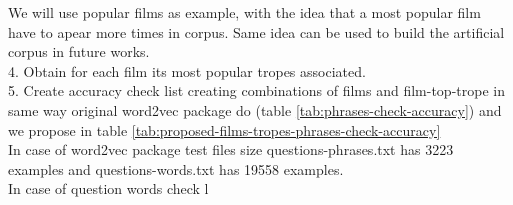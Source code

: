 \documentclass[letterpaper]{article}
\begin{document}
	     
	     We will use popular films as example, with the idea that a most popular film have to apear more times in corpus. Same idea can be used to build the artificial corpus in future works.\\
      4. Obtain for each film its most popular tropes associated.\\
      5. Create accuracy check list creating combinations of films and film-top-trope in same way original word2vec package do (table \ref{tab:phrases-check-accuracy}) and we propose in table \ref{tab:proposed-films-tropes-phrases-check-accuracy}\\ 
      
      In case of word2vec package test files size questions-phrases.txt has 3223 examples and questions-words.txt has 19558 examples.\\
      In case of question words check l
\end{document}
